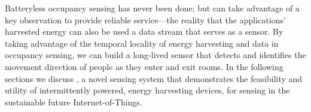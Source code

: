 Batteryless occupancy sensing has never been done; but can take advantage of a key observation to provide reliable service---the reality that the applications' harvested energy can also be used a data stream that serves as a sensor.
By taking advantage of the temporal locality of energy harvesting and data in occupancy sensing, we can build a long-lived sensor that detects and identifies the movement direction of people as they enter and exit rooms.
In the following sections we discuss \sysname, a novel sensing system that demonstrates the feasibility and utility of intermittently powered, energy harvesting devices, for sensing in the sustainable future Internet-of-Things.
